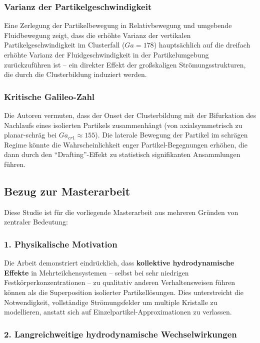 \documentclass[a4paper,12pt]{article}
\begin{document}
\subsubsection*{Varianz der Partikelgeschwindigkeit}

Eine Zerlegung der Partikelbewegung in Relativbewegung und umgebende Fluidbewegung zeigt, dass die erhöhte Varianz der vertikalen Partikelgeschwindigkeit im Clusterfall ($Ga = 178$) hauptsächlich auf die dreifach erhöhte Varianz der Fluidgeschwindigkeit in der Partikelumgebung zurückzuführen ist -- ein direkter Effekt der großskaligen Strömungsstrukturen, die durch die Clusterbildung induziert werden.

\subsubsection*{Kritische Galileo-Zahl}

Die Autoren vermuten, dass der Onset der Clusterbildung mit der Bifurkation des Nachlaufs eines isolierten Partikels zusammenhängt (von axialsymmetrisch zu planar-schräg bei $Ga_{cr1} \approx 155$). Die laterale Bewegung der Partikel im schrägen Regime könnte die Wahrscheinlichkeit enger Partikel-Begegnungen erhöhen, die dann durch den ``Drafting''-Effekt zu statistisch signifikanten Ansammlungen führen.

\subsection*{Bezug zur Masterarbeit}

Diese Studie ist für die vorliegende Masterarbeit aus mehreren Gründen von zentraler Bedeutung:

\subsubsection*{1. Physikalische Motivation}

Die Arbeit demonstriert eindrücklich, dass \textbf{kollektive hydrodynamische Effekte} in Mehrteilchensystemen -- selbst bei sehr niedrigen Festkörperkonzentrationen -- zu qualitativ anderen Verhaltensweisen führen können als die Superposition isolierter Partikellösungen. Dies unterstreicht die Notwendigkeit, vollständige Strömungsfelder um multiple Kristalle zu modellieren, anstatt sich auf Einzelpartikel-Approximationen zu verlassen.

\subsubsection*{2. Langreichweitige hydrodynamische Wechselwirkungen}
\end{document}
